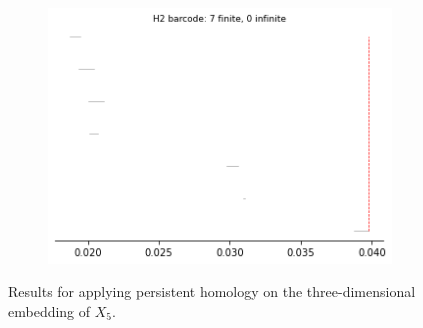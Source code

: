 \begin{figure}[H]
\begin{subfigure}[b]{0.24\textwidth}
\includegraphics[width=\textwidth]{figures/topology/X5_H2_barcode.png}
 \caption{}
\end{subfigure}
\caption{Results for applying persistent homology on the three-dimensional embedding of $X_5$.}
\end{figure}

